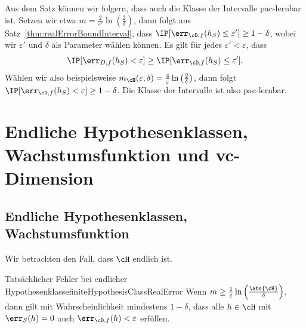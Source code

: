 \documentclass[language=ngerman,algolist,acrolist]{TemplateLecture}
\begin{document}
Aus dem Satz können wir folgern, dass auch die Klasse der Intervalle \ac{pac}-lernbar ist. Setzen wir etwa $m = \frac{2}{\varepsilon'}\ln\left( \frac{2}{\delta} \right)$, dann folgt aus Satz~\ref{thm:realErrorBoundInterval}, dass $\IP[\err_{\cD, f}(h_S) \leq \varepsilon'] \geq 1 - \delta$, wobei wir $\varepsilon'$ und $\delta$ als Parameter wählen können. Es gilt für jedes $\varepsilon' < \varepsilon$, dass 
\begin{equation*}
    \IP[\err_{D, f}(h_S) < \varepsilon] \geq \IP[\err_{\cD, f}(h_S) \leq \varepsilon'].
\end{equation*}
Wählen wir also beispielsweise $m_\cH(\varepsilon, \delta) = \frac{4}{\varepsilon} \ln\left( \frac{2}{\delta} \right)$, dann folgt $\IP[\err_{\cD, f}(h_S) < \varepsilon] \geq 1 - \delta$. Die Klasse der Intervalle ist also \ac{pac}-lernbar.


\chapter{Endliche Hypothesenklassen, Wachstumsfunktion und \acs{vc}-Dimension}

\section{Endliche Hypothesenklassen, Wachstumsfunktion}

Wir betrachten den Fall, dass $\cH$ endlich ist. 
\begin{thm}{Tatsächlicher Fehler bei endlicher Hypothesenklasse}{finiteHypothesisClassRealError}
    Wenn $m \geq \frac{1}{\varepsilon} \ln\left( \frac{\abs{\cH}}{\delta} \right)$, dann gilt mit Wahrscheinlichkeit mindestens $1 - \delta$, dass alle $h \in \cH$ mit $\err_S(h) = 0$ auch $\err_{\cD, f}(h) < \varepsilon$ erfüllen.
\end{thm}
\end{document}
